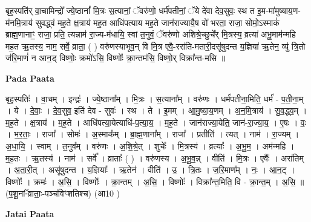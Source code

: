 \documentclass[17pt]{extarticle}
\begin{document}
बृह॒स्पति॑र् वा॒चामिन्द्रो᳚ ज्ये॒ष्ठानां᳚ मि॒त्रः स॒त्यानां॒ ॅवरु॑णो॒ धर्म॑पतीनां॒ ॅये दे॑वा देव॒सुवः॒ स्थ त इ॒म-मा॑मुष्याय॒ण-म॑नमि॒त्राय॑ सुवद्ध्वं मह॒ते क्ष॒त्राय॑ मह॒त आधि॑पत्याय मह॒ते जान॑राज्यायै॒ष वो॑ भरता॒ राजा॒ सोमो॒ऽस्माकं॑ ब्राह्म॒णानाꣳ॒॒ राजा॒ प्रति॒ त्यन्नाम॑ रा॒ज्य-म॑धायि॒ स्वां त॒नुवं॒ ॅवरु॑णो अशिश्रे॒च्छुचे᳚र् मि॒त्रस्य॒ व्रत्या॑ अभू॒माम॑न्महि मह॒त ऋ॒तस्य॒ नाम॒ सर्वे॒ व्राता॒ ( ) वरु॑णस्याभूव॒न् वि मि॒त्र एवै॒-ररा॑ति-मतारी॒दसू॑षुदन्त य॒ज्ञिया॑ ऋ॒तेन॒ व्यु॑ त्रि॒तो ज॑रि॒माणं॑ न आन॒ड् विष्णोः॒ क्रमो॑ऽसि॒ विष्णोः᳚ क्रा॒न्तम॑सि॒ विष्णो॒र् विक्रा᳚न्त-मसि ॥ \newline

\textbf{Pada Paata} \newline

बृह॒स्पतिः॑ । वा॒चम् । इन्द्रः॑ । ज्ये॒ष्ठाना᳚म् । मि॒त्रः । स॒त्याना᳚म् । वरु॑णः । धर्म॑पतीना॒मिति॒ धर्म॑ - प॒ती॒ना॒म् । ये । दे॒वाः॒ । दे॒व॒सुव॒ इति॑ देव - सुवः॑ । स्थ । ते । इ॒मम् । आ॒मु॒ष्या॒य॒णम् । अ॒न॒मि॒त्राय॑ । सु॒व॒द्ध्व॒म् । म॒ह॒ते । क्ष॒त्राय॑ । म॒ह॒ते । आधि॑पत्या॒येत्याधि॑-प॒त्या॒य॒ । म॒ह॒ते । जान॑राज्या॒येति॒ जान॑-रा॒ज्या॒य॒ । ए॒षः । वः॒ । भ॒र॒ताः॒ । राजा᳚ । सोमः॑ । अ॒स्माक᳚म् । ब्रा॒ह्म॒णाना᳚म् । राजा᳚ । प्रतीति॑ । त्यत् । नाम॑ । रा॒ज्यम् । अ॒धा॒यि॒ । स्वाम् । त॒नुव᳚म् । वरु॑णः । अ॒शि॒श्रे॒त् । शुचेः᳚ । मि॒त्रस्य॑ । व्रत्याः᳚ । अ॒भू॒म॒ । अम॑न्महि । म॒ह॒तः । ऋ॒तस्य॑ । नाम॑ । सर्वे᳚ । व्राताः᳚ ( ) । वरु॑णस्य । अ॒भू॒व॒न्न् । वीति॑ । मि॒त्रः । एवैः᳚ । अरा॑तिम् । अ॒ता॒री॒त् । असू॑षुदन्त । य॒ज्ञियाः᳚ । ऋ॒तेन॑ । वीति॑ । उ॒ । त्रि॒तः । ज॒रि॒माण᳚म् । नः॒ । आ॒न॒ट् । विष्णोः᳚ । क्रमः॑ । अ॒सि॒ । विष्णोः᳚ । क्रा॒न्तम् । अ॒सि॒ । विष्णोः᳚ । विक्रा᳚न्त॒मिति॒ वि - क्रा॒न्त॒म् । अ॒सि॒ ॥(प॒शू॒नां-ॅव्राताः॒-पञ्च॑विꣳशतिश्च) (आ10 )  \newline



\textbf{Jatai Paata} \newline
\end{document}

